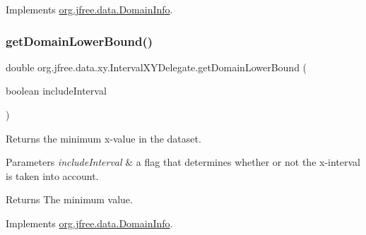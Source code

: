 Implements \mbox{\hyperlink{interfaceorg_1_1jfree_1_1data_1_1_domain_info_aeb90c8bc6d27c82c39abc99622846732}{org.\+jfree.\+data.\+Domain\+Info}}.

\mbox{\label{classorg_1_1jfree_1_1data_1_1xy_1_1_interval_x_y_delegate_a7ecacbb41b13efa1708571b8ada59998}} 
\subsubsection{\texorpdfstring{get\+Domain\+Lower\+Bound()}{getDomainLowerBound()}}
{\footnotesize\ttfamily double org.\+jfree.\+data.\+xy.\+Interval\+X\+Y\+Delegate.\+get\+Domain\+Lower\+Bound (\begin{DoxyParamCaption}\item[{boolean}]{include\+Interval }\end{DoxyParamCaption})}

Returns the minimum x-\/value in the dataset.


\begin{DoxyParams}{Parameters}
{\em include\+Interval} & a flag that determines whether or not the x-\/interval is taken into account.\\
\hline
\end{DoxyParams}
\begin{DoxyReturn}{Returns}
The minimum value. 
\end{DoxyReturn}


Implements \mbox{\hyperlink{interfaceorg_1_1jfree_1_1data_1_1_domain_info_ae1b4d9d415fe0a79bd2ce0f6e0a3f489}{org.\+jfree.\+data.\+Domain\+Info}}.

\mbox{\label{classorg_1_1jfree_1_1data_1_1xy_1_1_interval_x_y_delegate_a15d3687d86832c5cb4b8b346f716e8c2}} 
